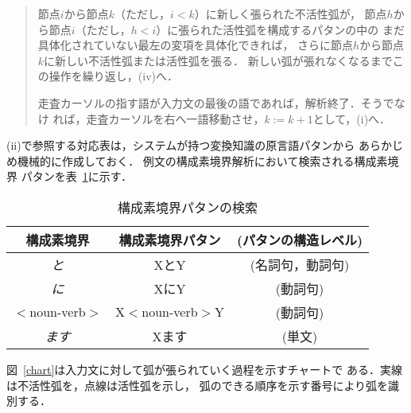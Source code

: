 \begin{quote}
\begin{enumerate}
{\item 節点$i$から節点$k$（ただし，$i<k$）に新しく張られた不活性弧が，
節点$h$から節点$i$（ただし，$h<i$）に張られた活性弧を構成するパタンの中の
まだ具体化されていない最左の変項を具体化できれば，
さらに節点$h$から節点$k$に新しい不活性弧または活性弧を張る．
新しい弧が張れなくなるまでこの操作を繰り返し，(iv)へ．
\item 走査カーソルの指す語が入力文の最後の語であれば，解析終了．そうでなけ
れば，走査カーソルを右へ一語移動させ，$k:=k+1$として，(i)へ．}
\end{enumerate}
\vspace*{6mm}
\end{quote}
\newpage

(ii)で参照する対応表は，システムが持つ変換知識の原言語パタンから
あらかじめ機械的に作成しておく．
例文の構成素境界解析において検索される構成素境界
パタンを表~\ref{ch1:tret}に示す．

\begin{table}[tbh]
\begin{center}
 \caption{構成素境界パタンの検索}
 \label{ch1:tret}
 \begin{small}
\begin{tabular}{|c|cc|} \hline
        構成素境界    &   構成素境界パタン & (パタンの構造レベル)  \\  \hline
        {\it と}  &   XとY  &     (名詞句，動詞句)\\
        {\it に} &    XにY & (動詞句)\\
        {\footnotesize $<$}noun-verb{\footnotesize $>$} &  X{\footnotesize $<$}noun-verb{\footnotesize $>$}Y &(動詞句)\\
        {\it ます} &  Xます  &(単文)\\ \hline
\end{tabular}
\end{small}
\end{center}
\end{table}

図~\ref{chart}は入力文に対して弧が張られていく過程を示すチャートで
ある．実線は不活性弧を，点線は活性弧を示し，
弧のできる順序を示す番号により弧を識別する．

\begin{figure*}[htb]
\begin{center}
\caption{構文解析の過程を示すチャート}
\label{chart}
\end{center}
\end{figure*}


